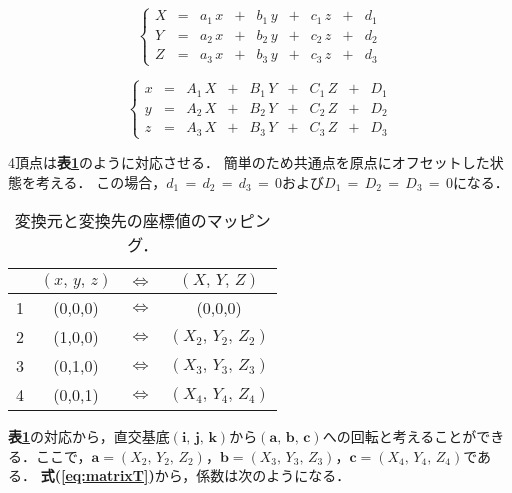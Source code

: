 \begin{equation}
\left\{
\begin{array}{lllllllll}
X & = & a_1\, x & + & b_1\, y & + & c_1\, z & + & d_1\\
Y & = & a_2\, x & + & b_2\, y & + & c_2\, z & + & d_2\\
Z & = & a_3\, x & + & b_3\, y & + & c_3\, z & + & d_3
\end{array}
\right.
\label{eq:trns-before}
\end{equation}

\begin{equation}
\left\{
\begin{array}{lllllllll}
x & = & A_1\, X & + & B_1\, Y & + & C_1\, Z & + & D_1\\
y & = & A_2\, X & + & B_2\, Y & + & C_2\, Z & + & D_2\\
z & = & A_3\, X & + & B_3\, Y & + & C_3\, Z & + & D_3
\end{array}
\right.
\label{eq:trns-after}
\end{equation}

4頂点は\textbf{表\ref{tbl:mapping node}}のように対応させる．
簡単のため共通点を原点にオフセットした状態を考える．
この場合，$d_1\,=\,d_2\,=\,d_3\,=\,0$および$D_1\,=\,D_2\,=\,D_3\,=\,0$になる．

\begin{table}[htdp]
\caption{変換元と変換先の座標値のマッピング．}
\begin{center}
\begin{tabular}{cccc} \toprule
  & $(x,\,y,\,z)$ & $\Leftrightarrow$ & $(X,\,Y,\,Z)$ \\ \midrule
1 & (0,0,0) & $\Leftrightarrow$ & (0,0,0)\\
2 & (1,0,0) & $\Leftrightarrow$ & $(X_2,\,Y_2,\,Z_2)$\\
3 & (0,1,0) & $\Leftrightarrow$ & $(X_3,\,Y_3,\,Z_3)$\\
4 & (0,0,1) & $\Leftrightarrow$ & $(X_4,\,Y_4,\,Z_4)$\\ \bottomrule
\end{tabular}
\end{center}
\label{tbl:mapping node}
\end{table}


\textbf{表\ref{tbl:mapping node}}の対応から，直交基底$(\bm i,\,\bm j,\,\bm k)$から$(\bm a,\,\bm b,\,\bm c)$への回転と考えることができる．ここで，$\bm a=(X_2,\,Y_2,\,Z_2)$，$\bm b=(X_3,\,Y_3,\,Z_3)$，$\bm c=(X_4,\,Y_4,\,Z_4)$である．
\textbf{式(\ref{eq:matrixT})}から，係数は次のようになる．

